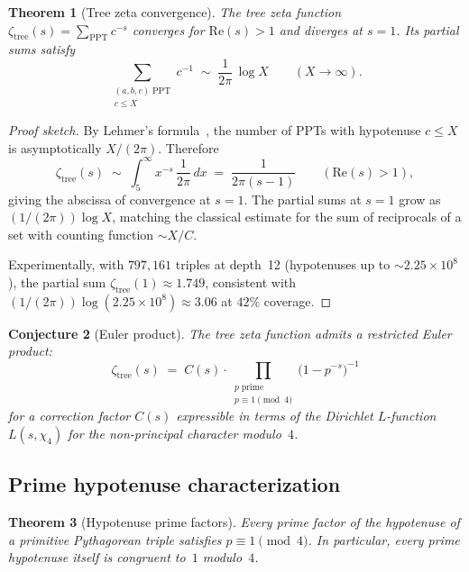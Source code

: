 \documentclass[12pt]{amsart}
\newtheorem{theorem}{Theorem}[section]
\newtheorem{conjecture}[theorem]{Conjecture}
\theoremstyle{definition}
\theoremstyle{remark}
\begin{document}
\begin{theorem}[Tree zeta convergence]\label{thm:zeta}
The tree zeta function $\zeta_{\mathrm{tree}}(s)=\sum_{\mathrm{PPT}} c^{-s}$
converges for $\mathrm{Re}(s)>1$ and diverges at $s=1$.  Its partial sums
satisfy
\[
  \sum_{\substack{(a,b,c)\;\mathrm{PPT} \\ c\le X}} c^{-1}
  \;\sim\; \frac{1}{2\pi}\,\log X
  \qquad (X\to\infty).
\]
\end{theorem}

\begin{proof}[Proof sketch]
By Lehmer's formula~\cite{Lehmer1900}, the number of PPTs with hypotenuse
$c\le X$ is asymptotically $X/(2\pi)$.  Therefore
\[
  \zeta_{\mathrm{tree}}(s) \;\sim\; \int_{5}^{\infty} x^{-s}\,\frac{1}{2\pi}\,dx
  \;=\; \frac{1}{2\pi(s-1)}\qquad(\mathrm{Re}(s)>1),
\]
giving the abscissa of convergence at $s=1$.  The partial sums at $s=1$ grow as
$(1/(2\pi))\log X$, matching the classical estimate for the sum of reciprocals
of a set with counting function $\sim X/C$.

Experimentally, with $797{,}161$ triples at depth~12 (hypotenuses up to $\sim2.25\times10^{8}$), the partial sum $\zeta_{\mathrm{tree}}(1)\approx1.749$, consistent with $(1/(2\pi))\log(2.25\times10^{8})\approx3.06$ at $42\%$ coverage.
\end{proof}

\begin{conjecture}[Euler product]\label{conj:euler}
The tree zeta function admits a restricted Euler product:
\[
  \zeta_{\mathrm{tree}}(s)
  \;=\; C(s)\cdot\prod_{\substack{p\;\mathrm{prime} \\ p\equiv1\pmod{4}}}
  \bigl(1-p^{-s}\bigr)^{-1}
\]
for a correction factor $C(s)$ expressible in terms of the Dirichlet
$L$-function $L(s,\chi_{4})$ for the non-principal character modulo~$4$.
\end{conjecture}

\subsection{Prime hypotenuse characterization}

\begin{theorem}[Hypotenuse prime factors]\label{thm:hyp-primes}
Every prime factor of the hypotenuse of a primitive Pythagorean triple satisfies
$p\equiv1\pmod{4}$.  In particular, every prime hypotenuse itself is congruent
to~$1$ modulo~$4$.
\end{theorem}
\end{document}

